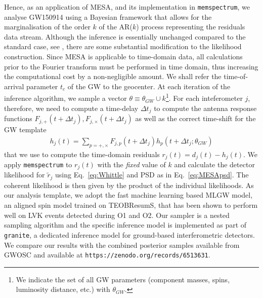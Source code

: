 \documentclass{aa}
\begin{document}
Hence, as an application of MESA, and its implementation in \texttt{memspectrum}, we analyse GW150914\cite{} using a Bayesian framework that allows for the marginalisation of the order  $k$ of the AR($k$) process representing the residuals data stream. Although the inference is essentially unchanged compared to the standard case, see \cite{lalinference}, there are some substantial modification to the likelihood construction. Since MESA is applicable to time-domain data, all calculations prior to the Fourier transform must be performed in time domain, thus increasing the computational cost by a non-negligible amount. We shall refer the time-of-arrival parameter $t_c$ of the GW to the geocenter. At each iteration of the inference algorithm, we sample a vector $\theta\equiv\theta_{GW}\cup k$\footnote{We indicate the set of all GW parameters (component masses, spins, luminosity distance, etc.) with $\theta_{GW}$.}. For each inteferometer $j$, therefore, we need to compute a time-delay $\Delta t_j$ to compute the antenna response functions $F_{j,+}(t+\Delta t_j),F_{j,\times}(t+\Delta t_j)$ as well as the correct time-shift for the GW template 
\begin{align}
h_j(t) =\sum_{p = +,\times}F_{j,p}(t+\Delta t_j)h_{p}(t+\Delta t_j;\theta_{GW})
\end{align}
that we use to compute the time-domain residuals $r_j(t) = d_j(t) - h_j(t)$. We apply \texttt{memspectrum} to $r_j(t)$ with the \emph{fixed} value of $k$ and calculate the detector likelihood for $\tilde{r}_j$ using Eq.~\eqref{eq:Whittle} and PSD as in Eq.~\eqref{eq:MESApsd}. The coherent likelihood is then given by the product of the individual likelihoods. As our analysis template, we adopt the fast machine learning based MLGW model\cite{MLGW}, an aligned spin model trained on TEOBResumS\cite{teobresums}, that has been shown to perform well on LVK events detected during O1 and O2\cite{MLGW}. Our sampler is a nested sampling algorithm\cite{cpnest} and the specific inference model is implemented as part of \texttt{granite}, a dedicated inference model for ground-based interferometric detectors. We compare our results with the combined posterior samples available from GWOSC\cite{GWOSC} and available at \texttt{https://zenodo.org/records/6513631}.
\end{document}
